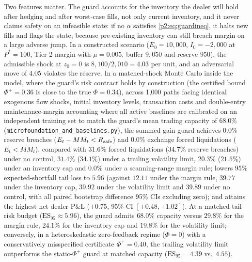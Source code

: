 Two features matter. The guard accounts for the inventory the dealer will hold after hedging and after worst-case fills, not only current inventory, and it never claims safety on an infeasible state: if no $\alpha$ satisfies \eqref{p2:eq:guardineq}, it halts new fills and flags the state, because pre-existing inventory can still breach margin on a large adverse jump. In a constructed scenario ($E_0=10{,}000$, $I_0=-2{,}000$ at $P^*=100$, Tier-2 margin with $\mu=0.005$, buffer $9{,}050$ and reserve $950$), the admissible shock at $z_0=0$ is $8{,}100/2{,}010=4.03$ per unit, and an adversarial move of $4.05$ violates the reserve. In a matched-shock Monte Carlo inside the model, where the guard's risk contract holds by construction (the certified bound $\Phi^+=0.36$ is close to the true $\Phi=0.34$), across 1{,}000 paths facing identical exogenous flow shocks, initial inventory levels, transaction costs and double-entry maintenance-margin accounting where all active baselines are calibrated on an independent training set to match the guard's mean trading capacity of $68.0\%$ (\texttt{microfoundation\_and\_baselines.py}), the summed-gain guard achieves $0.0\%$ reserve breaches ($E_t-MM_t<R_{\rm safe}$) and $0.0\%$ exchange forced liquidations ($E_t<MM_t$), compared with $31.6\%$ forced liquidations ($34.7\%$ reserve breaches) under no control, $31.4\%$ ($34.1\%$) under a trailing volatility limit, $20.3\%$ ($21.5\%$) under an inventory cap and $0.0\%$ under a scanning-range margin rule; lowers 95\% expected-shortfall tail loss to $5.96$ (against $12.11$ under the margin rule, $39.77$ under the inventory cap, $39.92$ under the volatility limit and $39.89$ under no control, with all paired bootstrap difference 95\% CIs excluding zero); and attains the highest net dealer P\&L ($+0.75$, 95\% CI $[+0.48,+1.02]$). At a matched tail-risk budget ($\mathrm{ES}_{95}\approx 5.96$), the guard admits $68.0\%$ capacity versus $29.8\%$ for the margin rule, $24.1\%$ for the inventory cap and $19.8\%$ for the volatility limit; conversely, in a heteroskedastic zero-feedback regime ($\Phi=0$) with a conservatively misspecified certificate $\Phi^+=0.40$, the trailing volatility limit outperforms the static-$\Phi^+$ guard at matched capacity ($\mathrm{ES}_{95}=4.39$ vs.\ $4.55$).

